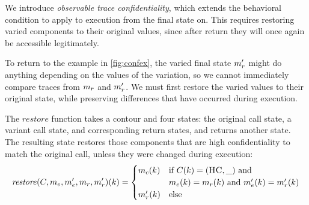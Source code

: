 \documentclass[acmsmall,review,anonymous]{acmart}\settopmatter{printfolios=true,printccs=false,printacmref=false}
\begin{document}
      We introduce {\em observable trace confidentiality}, which extends the
      behavioral condition to apply to execution from the final state on.
      This requires restoring varied components to their original values,
      since after return they will once again be accessible legitimately.

      To return to the example in \cref{fig:confex}, the varied final state
      \(m_r'\) might do anything depending on the values of the variation,
      so we cannot immediately compare traces from \(m_r\) and
      \(m_r'\). We must first restore the varied values to their original
      state, while preserving differences that have occurred during
      execution.


      The \(\mathit{restore}\) function takes a contour and four states: the
      original call state, a variant call state, and corresponding return
      states, and returns another state. The resulting state restores those
      components that are high confidentiality to match the original call,
      unless they were changed during execution:
      \[\mathit{restore}(C,m_e,m_e',m_r,m_r')
        (k) =
        \begin{cases}
          m_c(k) & \text{if } C(k) = (\textsc{HC},\_)
            \text{ and } \\
          & m_e(k) = m_r(k) \text{ and }
            m_e'(k) = m_r'(k) \\
          m_r'(k) & \text{else} \\
        \end{cases}\]
\end{document}

